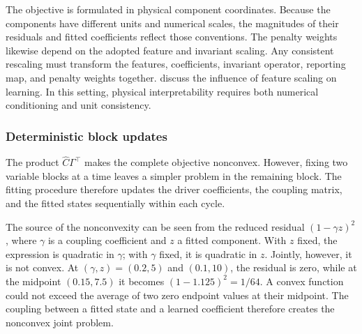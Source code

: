The objective is formulated in physical component coordinates. Because the components have different units and numerical scales, the magnitudes of their residuals and fitted coefficients reflect those conventions. The penalty weights likewise depend on the adopted feature and invariant scaling. Any consistent rescaling must transform the features, coefficients, invariant operator, reporting map, and penalty weights together. \citet{Pinheiro2025} discuss the influence of feature scaling on learning. In this setting, physical interpretability requires both numerical conditioning and unit consistency.

\subsubsection{Deterministic block updates}

The product \(\widehat C\Gamma^\top\) makes the complete objective nonconvex. However, fixing two variable blocks at a time leaves a simpler problem in the remaining block. The fitting procedure therefore updates the driver coefficients, the coupling matrix, and the fitted states sequentially within each cycle.

The source of the nonconvexity can be seen from the reduced residual \((1-\gamma z)^2\), where \(\gamma\) is a coupling coefficient and \(z\) a fitted component. With \(z\) fixed, the expression is quadratic in \(\gamma\); with \(\gamma\) fixed, it is quadratic in \(z\). Jointly, however, it is not convex. At \((\gamma,z)=(0.2,5)\) and \((0.1,10)\), the residual is zero, while at the midpoint \((0.15,7.5)\) it becomes \((1-1.125)^2=1/64\). A convex function could not exceed the average of two zero endpoint values at their midpoint. The coupling between a fitted state and a learned coefficient therefore creates the nonconvex joint problem.

